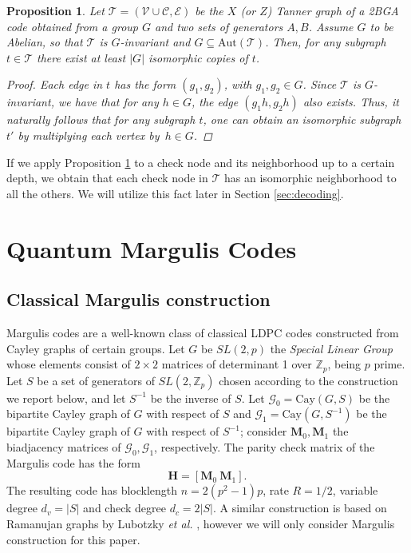 \documentclass[a4paper,twocolumn,11pt,accepted=2026-05-03]{quantumarticle}
\newtheorem{proposition}{Proposition}
\newcommand{\setv}{\mathcal{V}}
\newcommand{\setc}{\mathcal{C}}
\newcommand{\sete}{\mathcal{E}}
\newcommand{\setg}{\mathcal{G}}
\begin{document}
\begin{proposition}
\label{proposition:symmetry}
    Let $\mathcal{T} = (\setv \cup \setc,\sete)$ be the $X$ (or $Z$) Tanner graph of a 2BGA code obtained from a group $G$ and two sets of generators $A,B$. Assume $G$ to be Abelian, so that $\mathcal T$ is $G$-invariant and $G \subseteq \mathrm{Aut}(\mathcal{T})$. Then, for any subgraph $t \in \mathcal{T}$ there exist at least $|G|$ isomorphic copies of $t$.
    \begin{proof}
        Each edge in $t$ has the form $(g_1,g_2)$, with $g_1,g_2 \in G$. Since $\mathcal{T}$ is $G$-invariant, we have that for any $h \in G$, the edge $(g_1h,g_2h)$ also exists. Thus, it naturally follows that for any subgraph $t$, one can obtain an isomorphic subgraph $t'$ by multiplying each vertex by~$h \in G$. 
    \end{proof}
\end{proposition}
If we apply Proposition \ref{proposition:symmetry} to a check node and its neighborhood up to a certain depth, we obtain that each check node in $\mathcal{T}$ has an isomorphic neighborhood to all the others. We will utilize this fact later in Section \ref{sec:decoding}.






\section{Quantum Margulis Codes}
\label{sec:margulis}
\subsection{Classical Margulis construction}
Margulis codes \cite{margulis1982explicit} are a well-known class of classical LDPC codes constructed from Cayley graphs of certain groups. 
Let $G$ be $SL(2,p)$ the \textit{Special Linear Group} whose elements consist of $2\times 2$ matrices of determinant 1 over $\mathbb{Z}_p$, being $p$ prime. Let $S$ be a set of generators of $SL(2,\mathbb{Z}_p)$ chosen according to the construction we report below, and let $S^{-1}$ be the inverse of $S$. Let $\setg_0 = \mathrm{Cay}(G,S)$ be the bipartite Cayley graph of $G$ with respect of $S$ and $\setg_1 = \mathrm{Cay}(G,S^{-1})$ be the bipartite Cayley graph of $G$ with respect of $S^{-1}$; consider $\mathbf{M}_0,\mathbf{M}_1$ the biadjacency matrices of $\setg_0,\setg_1$, respectively. The parity check matrix of the Margulis code has the form
\begin{equation}
    \mathbf{H} = [\mathbf{M}_0\  \mathbf{M}_1].
\end{equation}
The resulting code has blocklength $n = 2(p^2-1)p$, rate $R=1/2$, variable degree $d_v=|S|$ and check degree $d_c=2|S|$.
A similar construction is based on Ramanujan graphs by Lubotzky \textit{et al.} \cite{rosenthal2000,MACKAY200397}, however we will only consider Margulis construction for this paper.
\end{document}

